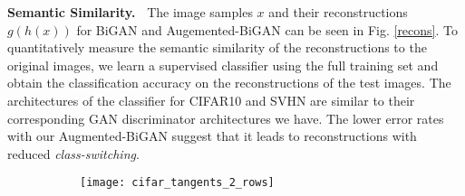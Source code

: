 \documentclass{article}
\begin{document}
{\bf Semantic Similarity.~} The image samples ${x}$ and their reconstructions ${g(h(x))}$ for BiGAN and Augemented-BiGAN can be seen in Fig. \ref{recons}. To quantitatively measure the semantic similarity of the reconstructions to the original images, we learn a supervised classifier using the full training set and obtain the classification accuracy on the reconstructions of the test images. The architectures of the classifier for CIFAR10 and SVHN are similar to their corresponding GAN discriminator architectures we have. The lower error rates with our Augmented-BiGAN suggest that it leads to reconstructions with reduced \emph{class-switching}. 

\begin{figure}[t]
    \centering
    \begin{subfigure}[t]{\textwidth}
        \centering
        \texttt{[image: cifar\_tangents\_2\_rows]}
    \end{subfigure}
    

\end{figure}
\end{document}
